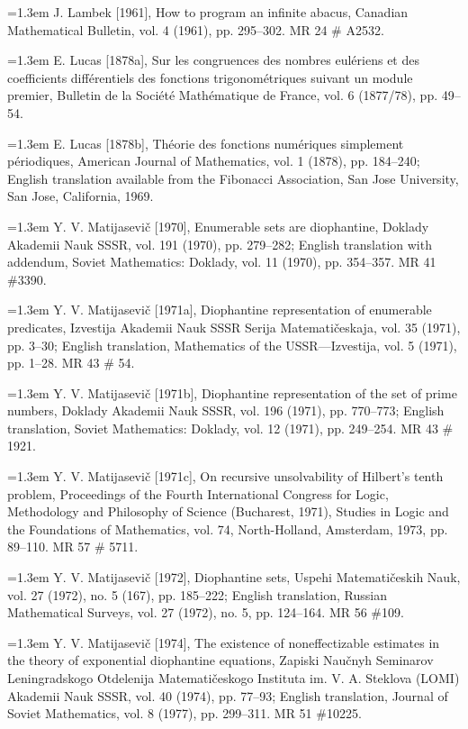 \documentclass[11pt,leqno]{article}
\newcommand{\origpage}[1]{\marginnote{\footnotesize\textbf{[#1]}}}
\newcommand{\bibentry}[1]{\par\noindent\hangindent=1.3em\hangafter=1 #1\par\smallskip}
\begin{document}
\bibentry{J. Lambek [1961], How to program an infinite abacus, Canadian Mathematical Bulletin, vol. 4 (1961), pp. 295--302. MR 24 \# A2532.}

\bibentry{E. Lucas [1878a], Sur les congruences des nombres eul\'{e}riens et des coefficients diff\'{e}rentiels des fonctions trigonom\'{e}triques suivant un module premier, Bulletin de la Soci\'{e}t\'{e} Math\'{e}matique de France, vol. 6 (1877/78), pp. 49--54.}

\bibentry{E. Lucas [1878b], Th\'{e}orie des fonctions num\'{e}riques simplement p\'{e}riodiques, American Journal of Mathematics, vol. 1 (1878), pp. 184--240; English translation available from the Fibonacci Association, San Jose University, San Jose, California, 1969.}

\bibentry{Y. V. Matijasevi\v{c} [1970], Enumerable sets are diophantine, Doklady Akademii Nauk SSSR, vol. 191 (1970), pp. 279--282; English translation with addendum, Soviet Mathematics: Doklady, vol. 11 (1970), pp. 354--357. MR 41 \#3390.}

\bibentry{Y. V. Matijasevi\v{c} [1971a], \origpage{829}Diophantine representation of enumerable predicates, Izvestija Akademii Nauk SSSR Serija Matemati\v{c}eskaja, vol. 35 (1971), pp. 3--30; English translation, Mathematics of the USSR---Izvestija, vol. 5 (1971), pp. 1--28. MR 43 \# 54.}

\bibentry{Y. V. Matijasevi\v{c} [1971b], Diophantine representation of the set of prime numbers, Doklady Akademii Nauk SSSR, vol. 196 (1971), pp. 770--773; English translation, Soviet Mathematics: Doklady, vol. 12 (1971), pp. 249--254. MR 43 \# 1921.}

\bibentry{Y. V. Matijasevi\v{c} [1971c], On recursive unsolvability of Hilbert's tenth problem, Proceedings of the Fourth International Congress for Logic, Methodology and Philosophy of Science (Bucharest, 1971), Studies in Logic and the Foundations of Mathematics, vol. 74, North-Holland, Amsterdam, 1973, pp. 89--110. MR 57 \# 5711.}

\bibentry{Y. V. Matijasevi\v{c} [1972], Diophantine sets, Uspehi Matemati\v{c}eskih Nauk, vol. 27 (1972), no. 5 (167), pp. 185--222; English translation, Russian Mathematical Surveys, vol. 27 (1972), no. 5, pp. 124--164. MR 56 \#109.}

\bibentry{Y. V. Matijasevi\v{c} [1974], The existence of noneffectizable estimates in the theory of exponential diophantine equations, Zapiski Nau\v{c}nyh Seminarov Leningradskogo Otdelenija Matemati\v{c}eskogo Instituta im. V. A. Steklova (LOMI) Akademii Nauk SSSR, vol. 40 (1974), pp. 77--93; English translation, Journal of Soviet Mathematics, vol. 8 (1977), pp. 299--311. MR 51 \#10225.}
\end{document}
